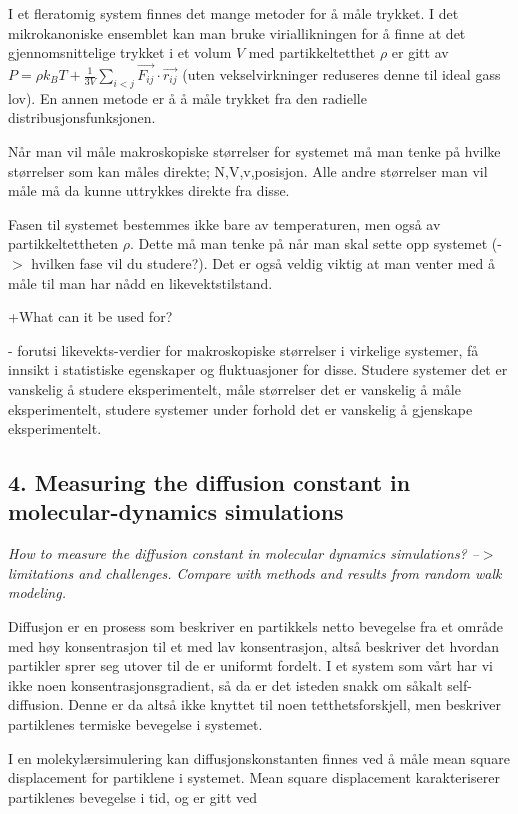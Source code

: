 \documentclass[a4paper,10pt]{article}
\begin{document}
I et fleratomig system finnes det mange metoder for å måle trykket. I det mikrokanoniske ensemblet kan man bruke viriallikningen for å finne at det gjennomsnittelige trykket i et volum $V$ med partikkeltetthet $\rho$ er gitt av $P = \rho k_BT+\frac{1}{3V}\sum_{i<j}\overrightarrow{F_{ij}}\cdot \overrightarrow{r_{ij}}$ (uten vekselvirkninger reduseres denne til ideal gass lov). En annen metode er å å måle trykket fra den radielle distribusjonsfunksjonen.

Når man vil måle makroskopiske størrelser for systemet må man tenke på hvilke størrelser som kan måles direkte; N,V,v,posisjon. Alle andre størrelser man vil måle må da kunne uttrykkes direkte fra disse. 

Fasen til systemet bestemmes ikke bare av temperaturen, men også av partikkeltettheten $\rho$. Dette må man tenke på når man skal sette opp systemet (-$>$ hvilken fase vil du studere?). Det er også veldig viktig at man venter med å måle til man har nådd en likevektstilstand. 

 +What can it be used for?

 - forutsi likevekts-verdier for makroskopiske størrelser i virkelige systemer, få innsikt i statistiske egenskaper og fluktuasjoner for disse. Studere systemer det er vanskelig å studere eksperimentelt, måle størrelser det er vanskelig å måle eksperimentelt, studere systemer under forhold det er vanskelig å gjenskape eksperimentelt. 

\subsection*{4. Measuring the diffusion constant in molecular-dynamics simulations}
\textit{How to measure the diffusion constant in molecular dynamics simulations? –$>$
limitations and challenges. Compare with methods and results from random
walk modeling.}

Diffusjon er en prosess som beskriver en partikkels netto bevegelse fra et område med høy konsentrasjon til et med lav konsentrasjon, altså beskriver det hvordan partikler sprer seg utover til de er uniformt fordelt. I et system som vårt har vi ikke noen konsentrasjonsgradient, så da er det isteden snakk om såkalt self-diffusion. Denne er da altså ikke knyttet til noen tetthetsforskjell, men beskriver partiklenes termiske bevegelse i systemet.

I en molekylærsimulering kan diffusjonskonstanten finnes ved å måle mean square displacement for partiklene i systemet. Mean square displacement karakteriserer partiklenes bevegelse i tid, og er gitt ved 
\end{document}
